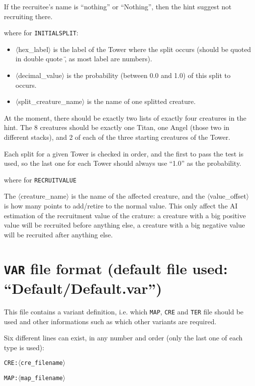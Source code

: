 \documentclass{article}
\begin{document}
If the recruitee's name is ``nothing'' or ``Nothing'', then the hint suggest not recruiting there.

where for \texttt{INITIALSPLIT}:

\begin{itemize}
\item $\langle$hex\_label$\rangle$ is the label of the Tower where the split occurs (should be quoted in double quote \", as most label are numbers).
\item $\langle$decimal\_value$\rangle$ is the probability (between 0.0 and 1.0) of this split to occurs.
\item $\langle$split\_creature\_name$\rangle$ is the name of one splitted creature.
\end{itemize}

At the moment, there should be exactly two lists of exactly four creatures in the hint. The 8 creatures should be exactly one Titan, one Angel (those two in different stacks), and 2 of each of the three starting creatures of the Tower.

Each split for a given Tower is checked in order, and the first to pass the test is used, so the last one for each Tower should always use ``1.0'' as the probability.

where for \texttt{RECRUITVALUE}

The $\langle$creature\_name$\rangle$ is the name of the affected creature, and the $\langle$value\_offset$\rangle$ is how many points to add/retire to the normal value. This only affect the AI estimation of the recruitment value of the crature: a creature with a big positive value will be recruited before anything else, a creature with a big negative value will be recruited after anything else.

\section{\texttt{VAR} file format (default file used: ``Default/Default.var'')}
\label{VAR}

This file contains a variant definition, i.e. which
\texttt{MAP}, \texttt{CRE} and \texttt{TER} file should be used and other informations such as which other variants are required.

Six different lines can exist, in any number and order (only the last one of each type is used):

\texttt{\texttt{CRE}:$\langle$cre\_filename$\rangle$}

\texttt{\texttt{MAP}:$\langle$map\_filename$\rangle$}
\end{document}
